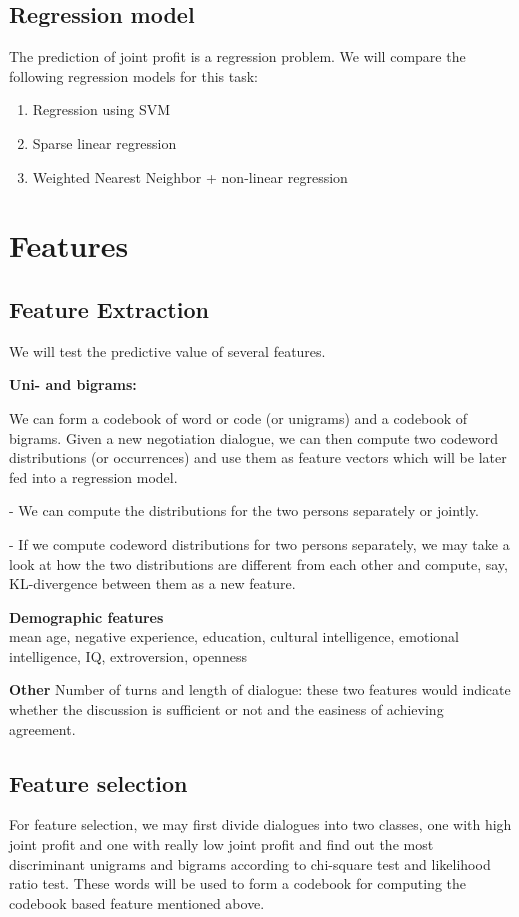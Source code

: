\documentclass[11pt]{article} %
\begin{document}
\subsection{Regression model}  %
The prediction of joint profit is a regression problem. We will compare the following regression models for this task:
\begin{enumerate}
\item Regression using SVM
\item Sparse linear regression
\item Weighted Nearest Neighbor + non-linear regression
\end{enumerate}

\section{Features}
\subsection{Feature Extraction}  %
We will test the predictive value of several features.

\textbf{Uni- and bigrams:} 

We can form a codebook of word or code (or unigrams) and a codebook of bigrams. Given a new negotiation dialogue, we can then compute two codeword distributions (or occurrences) and use them as feature vectors which will be later fed into a regression model.

-	We can compute the distributions for the two persons separately or jointly.

-	If we compute codeword distributions for two persons separately, we may take a look at how the two distributions are different from each other and compute, say, KL-divergence between them as a new feature.

\textbf{Demographic features} \\
mean age, negative experience, education, cultural intelligence, emotional intelligence, IQ, extroversion, openness

\textbf{Other}
Number of turns and length of dialogue: these two features would indicate whether the discussion is sufficient or not and the easiness of achieving agreement.

\subsection{Feature selection}  %
For feature selection, we may first divide dialogues into two classes, one with high joint profit and one with really low joint profit and find out the most discriminant unigrams and bigrams according to chi-square test and likelihood ratio test. These words will be used to form a codebook for computing the codebook based feature mentioned above.
\end{document}
